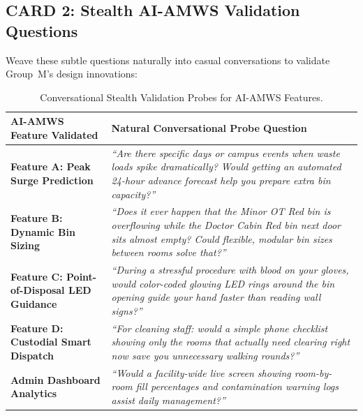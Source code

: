 \documentclass[11pt,a4paper]{article}
\begin{document}
\subsection{CARD 2: Stealth AI-AMWS Validation Questions}
Weave these subtle questions naturally into casual conversations to validate Group~M's design innovations:
\begin{table}[h!]
\centering
\small
\renewcommand{\arraystretch}{1.2}
\begin{tabularx}{\textwidth}{p{4.2cm}X}
\toprule
\rowcolor{iitblue}
\color{white}\textbf{AI-AMWS Feature Validated} & \color{white}\textbf{Natural Conversational Probe Question} \\
\midrule
\textbf{Feature A: Peak Surge Prediction} & \emph{``Are there specific days or campus events when waste loads spike dramatically? Would getting an automated 24-hour advance forecast help you prepare extra bin capacity?''} \\
\rowcolor{softgray}
\textbf{Feature B: Dynamic Bin Sizing} & \emph{``Does it ever happen that the Minor OT Red bin is overflowing while the Doctor Cabin Red bin next door sits almost empty? Could flexible, modular bin sizes between rooms solve that?''} \\
\textbf{Feature C: Point-of-Disposal LED Guidance} & \emph{``During a stressful procedure with blood on your gloves, would color-coded glowing LED rings around the bin opening guide your hand faster than reading wall signs?''} \\
\rowcolor{softgray}
\textbf{Feature D: Custodial Smart Dispatch} & \emph{``For cleaning staff: would a simple phone checklist showing only the rooms that actually need clearing right now save you unnecessary walking rounds?''} \\
\textbf{Admin Dashboard Analytics} & \emph{``Would a facility-wide live screen showing room-by-room fill percentages and contamination warning logs assist daily management?''} \\
\bottomrule
\end{tabularx}
\caption{Conversational Stealth Validation Probes for AI-AMWS Features.}
\end{table}
\end{document}
